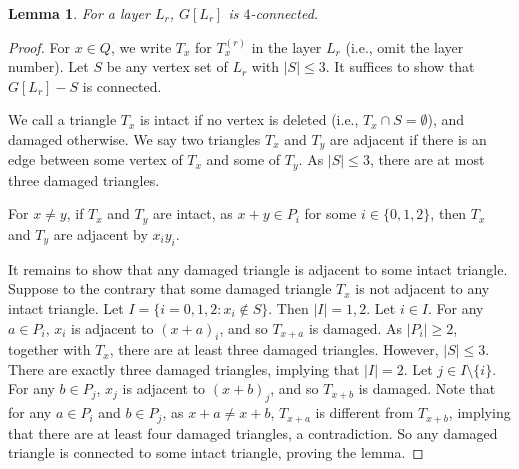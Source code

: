 \documentclass[12pt]{article}
\newtheorem{lemma}{Lemma}
\begin{document}
\begin{lemma}\label{layer}
For a layer $L_r$, $G[L_r]$ is $4$-connected.
\end{lemma}
\begin{proof}
For $x\in Q$, we write $T_x$ for $T_x^{(r)}$ in the layer $L_r$ (i.e., omit the layer number). Let $S$ be any vertex set of $L_r$ with $|S|\le 3$. It suffices to show that $G[L_r]-S$ is connected. 

We call a triangle $T_x$ is intact if no vertex is deleted (i.e., $T_x\cap S=\emptyset$), and damaged otherwise. We say two triangles $T_x$ and $T_y$ are adjacent if there is an edge between some vertex of $T_x$ and some of $T_y$. As $|S|\le 3$, there are at most three damaged triangles.

For $x\ne y$, if $T_x$ and $T_y$ are intact, as $x+y\in P_i$ for some $i\in \{0,1,2\}$, then $T_x$ and $T_y$ are adjacent by $x_iy_i$. 

It remains to show that any damaged triangle is adjacent to some intact triangle. Suppose to the contrary that some damaged triangle $T_x$ is not adjacent to any intact triangle. Let $I=\{i=0,1,2:x_i\notin S\}$. Then $|I|=1,2$. Let $i\in I$. For any $a\in P_i$, $x_i$ is adjacent to $(x+a)_i$, and so $T_{x+a}$ is damaged. As $|P_i|\ge 2$, together with $T_x$, there are at least three damaged triangles. However, $|S|\le 3$. There are exactly three damaged triangles, implying that $|I|=2$. Let $j\in I\setminus \{i\}$. For any $b\in P_j$, $x_j$ is adjacent to $(x+b)_j$, and so $T_{x+b}$ is damaged. Note that for any $a\in P_i$ and $b\in P_j$, as $x+a\ne x+b$, $T_{x+a}$ is different from $T_{x+b}$, implying that there are at least four damaged triangles, a contradiction. 
So any damaged triangle is connected to some intact triangle, proving the lemma.
\end{proof}
\end{document}

